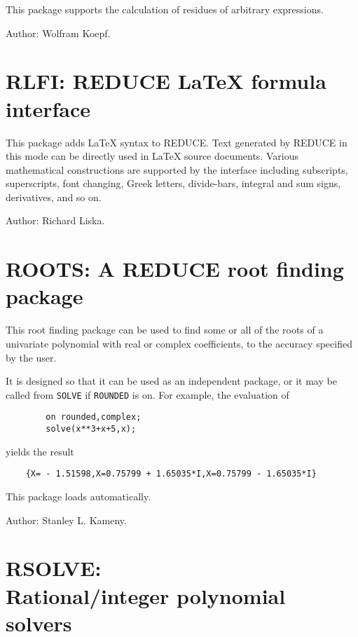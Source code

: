 This package supports the calculation of residues of arbitrary
expressions.

Author: Wolfram Koepf.



\newpage

\section{RLFI: REDUCE \LaTeX{} formula interface} 

This package adds \LaTeX{} syntax to REDUCE.  Text generated by REDUCE in
this mode can be directly used in \LaTeX{} source documents.  Various
mathematical constructions are supported by the interface including
subscripts, superscripts, font changing, Greek letters, divide-bars,
integral and sum signs, derivatives, and so on.

Author: Richard Liska.


\newpage

\section{ROOTS: A REDUCE root finding package} 

This root finding package can be used to find some or all of the roots of a
univariate polynomial with real or complex coefficients, to the accuracy
specified by the user.

It is designed so that it can be used as an independent package, or it may
be called from {\tt SOLVE} if {\tt ROUNDED} is on. For example,
the evaluation of
\begin{verbatim}
        on rounded,complex;
        solve(x**3+x+5,x);
\end{verbatim}
yields the result
\begin{verbatim}
    {X= - 1.51598,X=0.75799 + 1.65035*I,X=0.75799 - 1.65035*I}
\end{verbatim}

This package loads automatically.

Author: Stanley L. Kameny.


\newpage

\section[RSOLVE: Rational/integer polynomial solvers]%
        {RSOLVE: \protect\\ Rational/integer polynomial solvers}

